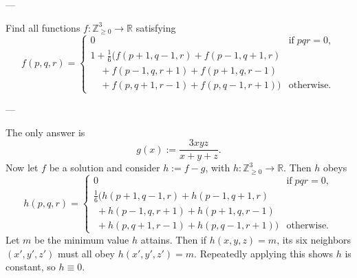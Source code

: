 
---

Find all functions $f:\mathbb Z_{\ge0}^3\to\mathbb R$ satisfying
\[
    f(p,q,r)=
    \begin{cases} 0 & \text{if} \; pqr=0, \\
        1+\frac16(f(p+1,q-1,r)+f(p-1,q+1,r) & \\
            \quad+f(p-1,q,r+1)+f(p+1,q,r-1) & \\
        \quad+f(p,q+1,r-1)+f(p,q-1,r+1)) & \text{otherwise.}
    \end{cases}
\]

---

The only answer is \[g(x):=\frac{3xyz}{x+y+z}.\]
Now let $f$ be a solution and consider $h:=f-g$, with $h:\mathbb Z_{\ge0}^3\to\mathbb R$. Then $h$ obeys
\[
    h(p,q,r)=
    \begin{cases} 0 & \text{if} \; pqr=0, \\
        \frac16(h(p+1,q-1,r)+h(p-1,q+1,r) & \\
            \;+h(p-1,q,r+1)+h(p+1,q,r-1) & \\
        \;+h(p,q+1,r-1)+h(p,q-1,r+1)) & \text{otherwise.}
    \end{cases}
\]
Let $m$ be the minimum value $h$ attains. Then if $h(x,y,z)=m$, its six neighbors $(x',y',z')$ must all obey $h(x',y',z')=m$. Repeatedly applying this shows $h$ is constant, so $h\equiv0$.

